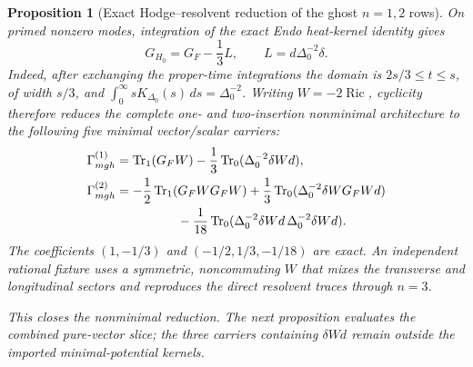 \documentclass[11pt]{article}
\newtheorem{proposition}[theorem]{Proposition}
\theoremstyle{definition}
\theoremstyle{remark}
\begin{document}
\begin{proposition}[Exact Hodge--resolvent reduction of the ghost
$n=1,2$ rows]
On primed nonzero modes, integration of the exact Endo heat-kernel identity
gives
\[
 G_{H_0}=G_F-\frac13L,
 \qquad L=d\Delta_0^{-2}\delta .
\]
Indeed, after exchanging the proper-time integrations the domain is
$2s/3\leq t\leq s$, of width $s/3$, and
$\int_0^\infty sK_{\Delta_0}(s)\,ds=\Delta_0^{-2}$.
Writing $W=-2\operatorname{Ric}$, cyclicity therefore reduces the complete
one- and two-insertion nonminimal architecture to the following five
minimal vector/scalar carriers:
\begin{align*}
 \Gamma^{(1)}_{
m gh}
 &=\operatorname{Tr}_1(G_FW)-\frac13\operatorname{Tr}_0(\Delta_0^{-2}\delta Wd),\\
 \Gamma^{(2)}_{
m gh}
 &=-\frac12\operatorname{Tr}_1(G_FW G_FW)
   +\frac13\operatorname{Tr}_0(\Delta_0^{-2}\delta W G_FWd)\\
 &\hspace{1.7cm}
   -\frac1{18}\operatorname{Tr}_0(\Delta_0^{-2}\delta Wd\,
                          \Delta_0^{-2}\delta Wd).
\end{align*}
The coefficients $(1,-1/3)$ and $(-1/2,1/3,-1/18)$ are exact.  An
independent rational fixture uses a symmetric, noncommuting $W$ that mixes
the transverse and longitudinal sectors and reproduces the direct resolvent
traces through $n=3$.

This closes the nonminimal reduction.  The next proposition evaluates the
combined pure-vector slice; the three carriers containing $\delta Wd$ remain
outside the imported minimal-potential kernels.
\end{proposition}
\end{document}
